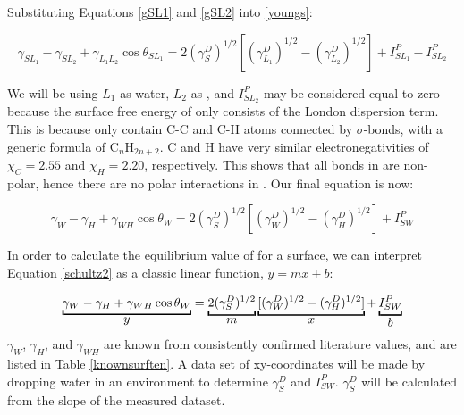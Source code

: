 Substituting Equations \ref{gSL1} and \ref{gSL2} into \ref{youngs}:

\begin{equation} 
\label{schultz1}
	\gamma_{SL_{1}}-\gamma_{SL_{2}}+\gamma_{L_{1}L_{2}}\cos\theta_{SL_{1}} = 2(\gamma_{S}^{D})^{1/2}  [(\gamma_{L_{1}}^{D})^{1/2}-(\gamma_{L_{2}}^{D})^{1/2}] + I_{SL_{1}}^{P} - I_{SL_{2}}^{P}
\end{equation}

We will be using $L_{1}$ as water, $L_{2}$ as \nalk[s], and $I_{SL_{2}}^{P}$ may be considered equal to zero because the surface free energy of \nalk[s] only consists of the London dispersion term. This is because \nalk[s] only contain C-C and C-H atoms connected by $\sigma$-bonds, with a generic formula of C$_{n}$H$_{2n+2}$. C and H have very similar electronegativities of $\chi_{C}=2.55$ and $\chi_{H}=2.20$, respectively. This shows that all bonds in \nalk[s] are non-polar, hence there are no polar interactions in \nalk[s]. Our final equation is now:

\begin{equation} 
\label{schultz2}
	\gamma_{W}-\gamma_{H}+\gamma_{WH}\cos\theta_{W} = 2(\gamma_{S}^{D})^{1/2}  [(\gamma_{W}^{D})^{1/2}-(\gamma_{H}^{D})^{1/2}] + I_{SW}^{P} 
\end{equation} 

In order to calculate the equilibrium value of \gamSV for a surface, we can interpret Equation \ref{schultz2} as a classic linear function, $y = mx + b$:

\[
\underbracket{\gamma_{W}-\gamma_{H}+\gamma_{WH}\cos\theta_{W}}_{\text{\normalsize{$y$}}} =
\underbracket{2(\gamma_{S}^{D})^{1/2}}_{\text{\normalsize{$m$}}}  
\underbracket{[(\gamma_{W}^{D})^{1/2}-(\gamma_{H}^{D})^{1/2}] }_{\text{\normalsize{$x$}}} + 
\underbracket{I_{SW}^{P}}_{\text{\normalsize{$b$}}} 
\] 
$\gamma_{W}$, $\gamma_{H}$, and $\gamma_{WH}$ are known from consistently confirmed literature values,\cite{Chassin1986,Smitthipong2004,Takanashi2013,Nakamura2015} and are listed in Table \ref{knownsurften}. A data set of xy-coordinates will be made by dropping water in an \nalk environment to determine $\gamma_{S}^{D}$ and $I_{SW}^{P} $. $\gamma_{S}^{D} $ will be calculated from the slope of the measured dataset. 

